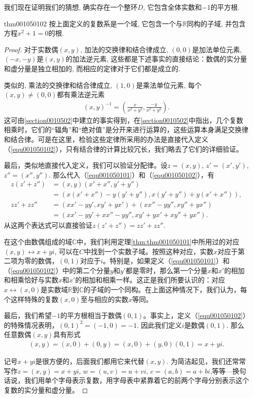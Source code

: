 我们现在证明我们的猜想, 确实存在一个整环$D$, 它包含全体实数和$-1$的平方根. 

\begin{theorem}{}{thm001050102}
按上面定义的复数系是一个域, 它包含一个与$\mathbb{R}$同构的子域, 并包含方程$x^2+1=0$的根. 
\end{theorem}

\begin{proof}
对于实数偶$(x,y)$, 加法的交换律和结合律成立, $(0,0)$是加法单位元素, $(-x,-y)$是$(x,y)$的加法逆元素, 这些都是下述事实的直接结论：数偶的实分量和虚分量是独立相加的, 而相应的定律对于它们都是成立的. 

类似的, 乘法的交换律和结合律成立, $(1,0)$是乘法单位元素, 每个$(x,y) \neq (0,0)$都有乘法逆元素
\begin{gather}\label{equ001050103}
(x,y)^{-1} = \left(\frac{x}{x^2+y^2}, \frac{-y}{x^2+y^2}\right).
\end{gather}
这可由\ref{section0010502}中建立的事实得到，在\ref{section0010502}中指出，几个复数相乘时，它们的“辐角”和“绝对值”是分开来进行运算的，这些运算本身满足交换律和结合律。可是在这里，检验这些定律所采用的办法是直接代入定义（\ref{equ001050102}），只有结合律的计算比较冗长，我们略去了它们的详细验证。

最后，类似地直接代入定义，我们可以验证分配律。设$z = (x, y)$, $z' = (x', y')$, $z'' = (x'', y'')$. 那么代入（\ref{equ001050101}）和（\ref{equ001050102}），有
\[
\begin{aligned}
z(z'+z'') &= (x, y)(x'+x'', y'+y'')\\
&= (x(x'+x'') - y(y'+y''), x(y'+y'') + y(x'+x'')),\\
zz'+zz'' &= (xx' - yy', xy'+yx') + (xx''-yy'', xy''+yx'')\\
&= (xx'-yy'+xx''-yy'', xy'+yx'+xy''+yx'').
\end{aligned}
\]
从这两个表达式可以直接验证$z(z'+z'') = zz'+zz''$.

在这个由数偶组成的域$\mathbb{C}$中，我们利用定理\ref{thm:thm001050101}中所用过的对应$(x, y) \leftrightarrow x+yi$, 可以在$C$中找到一个实数子域。按照这种对应，实数$x$对应于第二项为零的数偶，$(0,1)$对应于$i$。特别是，如果定义（\ref{equ001050101}）和（\ref{equ001050102}）中的第二个分量$y$和$y'$都是零时，那么第一个分量$x$和$x'$的相加和相乘恰好与实数$x$和$x'$的相加和相乘一样。这正是我们所要认识的：对应$x \leftrightarrow (x,0)$是实数域$\mathbb{R}$到$\mathbb{C}$的子域的一个同构。在上面这种情况下，我们认为，每个这样特殊的复数$(x,0)$至与相应的实数$x$等同。

最后，我们希望$-1$的平方根相当于数偶$(0, 1)$。事实上，定义（\ref{equ001050102}）的特殊情况表明，$(0, 1)^2 = (-1, 0) = -1$. 因此我们定义$i$是数偶$(0, 1)$. 那么任意数偶$(x,y)$具有形式
\begin{gather}\label{equ001050104}
(x, y) = (x, 0) + (0, y) = (x,0) + (y, 0)(0,1) = x + yi.
\end{gather}

记号$x+yi$是很方便的，后面我们都用它来代替$(x, y)$. 为简洁起见，我们还常常写作$z = (x,y) = x+yi$, $w = (u, v) = u + vi$, $c = (a, b) = a + bi$,等等---换句话说，我们用单个字母表示复数，用字母表中紧靠着它的前两个字母分别表示这个复数的实分量和虚分量。
\end{proof}

